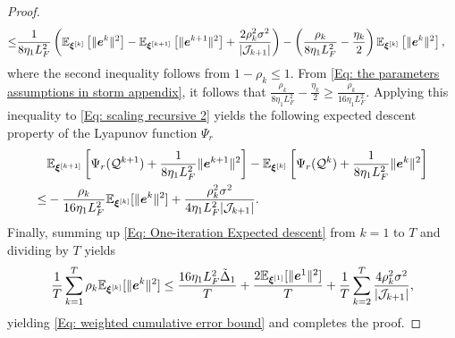 \begin{proof}
{\begin{align}
        \leq & \frac{1}{8\eta_{1}L_{F}^{2}}\left(\mathbb{E}_{\bm{\xi}^{[k]}}\left[\| \bm{e}^{k}\|^{2}\right] - \mathbb{E}_{\bm{\xi}^{[k+1]}}\left[\| \bm{e}^{k+1}\|^{2}\right] + \frac{2 \rho_{k}^{2}\sigma^{2}}{|\mathcal{J}_{k+1}|}\right) - \left( \frac{\rho_{k}}{8\eta_{1}L_{F}^{2}}- \frac{\eta_{k}}{2}\right)\mathbb{E}_{\bm{\xi}^{[k]}}\left[\| \bm{e}^{k}\|^{2}\right] , \label{Eq: scaling recursive 2}
    \end{align}}where the second inequality follows from $ 1 - \rho_{k}\leq 1$.
    From \eqref{Eq: the parameters assumptions in storm appendix}, it follows that
    $\frac{\rho_{k}}{8\eta_{1}L_{F}^{2}}- \frac{\eta_{k}}{2}\geq \frac{\rho_{k}}{16\eta_{1}L_{F}^{2}}$.
    Applying this inequality to \eqref{Eq: scaling recursive 2} yields the following
    expected descent property of the Lyapunov function $\Psi_r$
    \begin{align}
        \label{Eq: One-iteration Expected descent} & \mathbb{E}_{\bm{\xi}^{[k+1]}}\left[ \Psi_r(\mathcal{Q}^{k+1}) + \frac{1}{8\eta_{1}L_{F}^{2}}\| \bm{e}^{k+1}\|^{2}\right] - \mathbb{E}_{\bm{\xi}^{[k]}}\left[ \Psi_r(\mathcal{Q}^{k}) + \frac{1}{8\eta_{1}L_{F}^{2}}\| \bm{e}^{k}\|^{2}\right] \notag \\
        \leq                                       & - \frac{\rho_{k}}{16\eta_{1}L_{F}^{2}}\mathbb{E}_{\bm{\xi}^{[k]}}[\| \bm{e}^{k}\|^{2}] + \frac{\rho_{k}^{2}\sigma^{2}}{4\eta_{1}L_{F}^{2}| \mathcal{J}_{k+1}|}.
    \end{align}
    Finally, summing up \eqref{Eq: One-iteration Expected descent} from $k=1$ to
    $T$ and dividing by $T$ yields
    \[
        \frac{1}{T}\sum\limits_{ k =1}^{T} \rho_{k}\mathbb{E}_{\bm{\xi}^{[k]}}[\| \bm{e}^{k}\|^{2}]\leq \frac{16\eta_{1}L_{F}^{2}\tilde{\Delta}_{1}}{T}
        + \frac{2\mathbb{E}_{\bm{\xi}^{[1]}}[\| \bm{e}^{1}\|^{2}]}{T}+ \frac{1}{T}\sum\limits_{k=2}
        ^{T}\frac{4 \rho_{k}^{2}\sigma^{2}}{|\mathcal{J}_{k+1}|},
    \]yielding \eqref{Eq: weighted cumulative error bound} and completes the proof. 
\end{proof}

